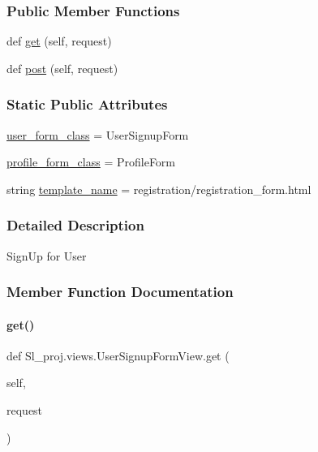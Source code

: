 \subsubsection*{Public Member Functions}
\begin{DoxyCompactItemize}
\item 
def \hyperlink{classSl__proj_1_1views_1_1UserSignupFormView_af92fcf185e0e0886e64305e3a39969d5}{get} (self, request)
\item 
def \hyperlink{classSl__proj_1_1views_1_1UserSignupFormView_add952bd04c92997f2a85d2310a76d661}{post} (self, request)
\end{DoxyCompactItemize}
\subsubsection*{Static Public Attributes}
\begin{DoxyCompactItemize}
\item 
\hyperlink{classSl__proj_1_1views_1_1UserSignupFormView_aecdb5a06ba11aeb68ebde787575bb26d}{user\+\_\+form\+\_\+class} = User\+Signup\+Form
\item 
\hyperlink{classSl__proj_1_1views_1_1UserSignupFormView_aaf38c69a7184f4380dc15272af688803}{profile\+\_\+form\+\_\+class} = Profile\+Form
\item 
string \hyperlink{classSl__proj_1_1views_1_1UserSignupFormView_afd4b01f72371b9bfb504252a782aa1ae}{template\+\_\+name} = \textquotesingle{}registration/registration\+\_\+form.\+html\textquotesingle{}
\end{DoxyCompactItemize}


\subsubsection{Detailed Description}
Sign\+Up for User 

\subsubsection{Member Function Documentation}
\mbox{\label{classSl__proj_1_1views_1_1UserSignupFormView_af92fcf185e0e0886e64305e3a39969d5}} 
\paragraph{\texorpdfstring{get()}{get()}}
{\footnotesize\ttfamily def Sl\+\_\+proj.\+views.\+User\+Signup\+Form\+View.\+get (\begin{DoxyParamCaption}\item[{}]{self,  }\item[{}]{request }\end{DoxyParamCaption})}


